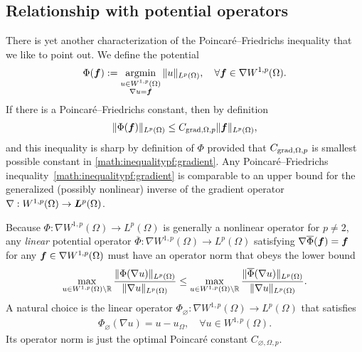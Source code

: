 \documentclass[10pt,a4paper]{article}
\begin{document}
\subsection{Relationship with potential operators}

There is yet another characterization of the Poincar\'e--Friedrichs inequality that we like to point out. 
We define the potential 
\begin{align*}
    \Phi( \bm{f} ) := \operatorname*{{\rm argmin}}\limits_{ \substack{ u \in W^{1,p}(\Omega) \\ \nabla u = \bm{f} } } \| u \|_{L^{p}(\Omega)},
    \quad 
    \forall 
    \bm{f} \in \nabla W^{1,p}(\Omega)
    .
\end{align*}
If there is a Poincar\'e--Friedrichs constant, then by definition
\begin{align*}
    \| \Phi(\bm{f}) \|_{L^{p}(\Omega)} \leq C_{\operatorname{grad},\Omega,p} \| \bm{f} \|_{L^{p}(\Omega)},
\end{align*}
and this inequality is sharp by definition of $\Phi$ provided that $C_{\operatorname{grad},\Omega,p}$ is smallest possible constant in \eqref{math:inequalitypf:gradient}. 
Any Poincar\'e--Friedrichs inequality~\eqref{math:inequalitypf:gradient} is comparable to an upper bound for the generalized (possibly nonlinear) inverse of the gradient operator $\nabla : W^{1,p}(\Omega) \rightarrow \bm{L}^{p}(\Omega)$. 

Because $\Phi : \nabla W^{1,p}(\Omega) \rightarrow L^{p}(\Omega)$ is generally a nonlinear operator for $p \neq 2$,
any \textit{linear} potential operator $\overline\Phi : \nabla W^{1,p}(\Omega) \rightarrow L^{p}(\Omega)$
satisfying $\nabla \overline\Phi( \bm{f} ) = \bm{f}$ for any $\bm{f} \in \nabla W^{1,p}(\Omega)$ must have an operator norm that obeys the lower bound 
\begin{align*}
    \max\limits_{ u \in W^{1,p}(\Omega) \setminus {\mathbb R} } 
    \frac{ \| \Phi(\nabla u) \|_{L^{p}(\Omega)} }{ \| \nabla u \|_{L^{p}(\Omega)} }
    \leq 
    \max\limits_{ u \in W^{1,p}(\Omega) \setminus {\mathbb R} } 
    \frac{ \| \overline\Phi(\nabla u) \|_{L^{p}(\Omega)} }{ \| \nabla u \|_{L^{p}(\Omega)} }
    .
\end{align*}
A natural choice is the linear operator $\Phi_{\varnothing} : \nabla W^{1,p}(\Omega) \rightarrow L^{p}(\Omega)$ that satisfies 
\begin{align*}
    \Phi_{\varnothing}( \nabla u ) = u - u_{\Omega},
    \quad 
    \forall 
    u \in W^{1,p}(\Omega)
    .
\end{align*}
Its operator norm is just the optimal Poincar\'e constant $C_{\varnothing,\Omega,p}$.
\end{document}
